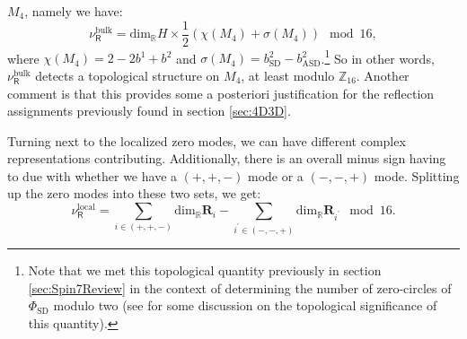 \documentclass[12pt]{article}%
\numberwithin{equation}{section}
\renewcommand{\(}{\left(}
\renewcommand{\)}{\right)}
\renewcommand{\[}{\left[}
\renewcommand{\]}{\right]}
\begin{document}
$M_4$, namely we have:
\begin{equation} \label{eqn:bulknu}
\nu^{\mathrm{bulk}}_{\mathsf{R}} = \mathrm{dim}_{\mathbb{R}} H \times \frac{1}{2}( \chi(M_4) + \sigma(M_4)) \mod 16,
\end{equation}
where $\chi(M_4) = 2 - 2b^1 + b^2 $ and $\sigma(M_4) = b^{2}_{\mathrm{SD}} - b^{2}_{\mathrm{ASD}}$.\footnote{Note that we met this topological quantity previously in section \ref{sec:Spin7Review} in the context of determining the number of zero-circles of $\Phi_{\mathrm{SD}}$ modulo two (see \cite{perutz2006zero} for some discussion on the topological significance of this quantity).} So in other words, $\nu^{\mathrm{bulk}}_{\mathsf{R}}$ detects
a topological structure on $M_4$, at least modulo $\mathbb{Z}_{16}$. Another comment is
that this provides some a posteriori justification for the reflection assignments previously found in
section \ref{sec:4D3D}.

Turning next to the localized zero modes, we can have different complex representations contributing.
Additionally, there is an overall minus sign having to due with whether
we have a $(+,+,-)$ mode or a $(-,-,+)$ mode. Splitting up the zero modes into these two sets,
we get:
\begin{equation}
\nu^{\mathrm{local}}_{\mathsf{R}} =
\underset{i \in (+,+,-)}{\sum} \mathrm{dim}_{\mathbb{R}} \mathbf{R}_{i} - \underset{i^{\prime} \in (-,-,+)}{\sum} \mathrm{dim}_{\mathbb{R}} \mathbf{R}_{i^{\prime}} \mod 16.
\end{equation}
\end{document}
